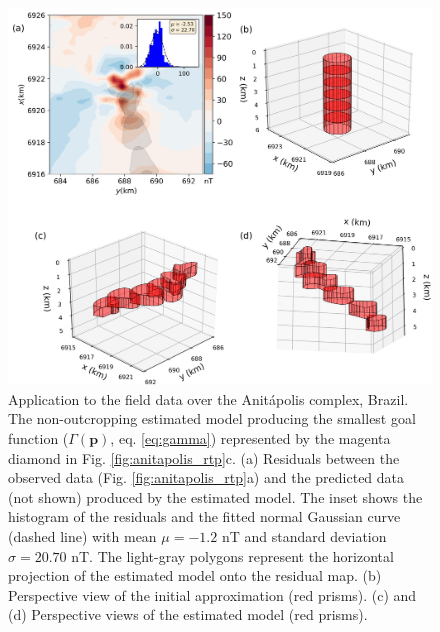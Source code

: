 \begin{figure}
	\centering
	\includegraphics[width=\linewidth]{figures/real_results_magenta_diamond.png}
	\caption{Application to the field data over the Anit{\'a}polis complex, Brazil.
	The non-outcropping estimated model producing the smallest goal function 
	($ \Gamma(\mathbf{p})$, eq. \ref{eq:gamma})	represented by the magenta diamond 
	in Fig. \ref{fig:anitapolis_rtp}c.
	(a) Residuals between the observed data (Fig. \ref{fig:anitapolis_rtp}a) and the 
	predicted data (not shown) produced by the estimated model. 
	The inset shows the histogram of the residuals and the fitted normal 
	Gaussian curve (dashed line) with mean $\mu = -1.2$ nT and 
	standard deviation $\sigma = 20.70$ nT.
	The light-gray polygons represent the horizontal projection of the estimated 
	model onto the residual map. 
	(b) Perspective view of the initial approximation (red prisms). 
	(c) and (d) Perspective views of the estimated model (red prisms).}
	\label{fig:real_result2}
\end{figure}

